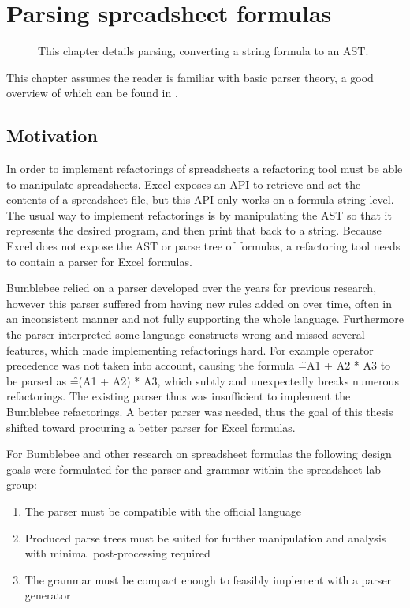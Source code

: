 \chapter{Parsing spreadsheet formulas}
\label{chapter:parsing}

\noindent
\begin{figure}[h]
\centerfloat

\caption{This chapter details parsing, converting a string formula to an AST.}
\end{figure}


\noindent
This chapter assumes the reader is familiar with basic parser theory, a good overview of which can be found in \cite{dragonbook}.

\section{Motivation}

In order to implement refactorings of spreadsheets a refactoring tool must be able to manipulate spreadsheets.
Excel exposes an API to retrieve and set the contents of a spreadsheet file, but this API only works on a formula string level.
The usual way to implement refactorings is by manipulating the AST so that it represents the desired program, and then print that back to a string.
Because Excel does not expose the AST or parse tree of formulas, a refactoring tool needs to contain a parser for Excel formulas.

Bumblebee relied on a parser developed over the years for previous research, however this parser suffered from having new rules added on over time, often in an inconsistent manner and not fully supporting the whole language.
Furthermore the parser interpreted some language constructs wrong and missed several features, which made implementing refactorings hard.
For example operator precedence was not taken into account, causing the formula \f{=A1 + A2 * A3} to be parsed as \f{=(A1 + A2) * A3}, which subtly and unexpectedly breaks numerous refactorings.
The existing parser thus was insufficient to implement the Bumblebee refactorings.
A better parser was needed, thus the goal of this thesis shifted toward procuring a better parser for Excel formulas.

For Bumblebee and other research on spreadsheet formulas the following design goals were formulated for the parser and grammar within the spreadsheet lab group:

\begin{enumerate}
\label{sec:designgoals}
\item The parser must be compatible with the official language
\item Produced parse trees must be suited for further manipulation and analysis with minimal post-processing required
\item The grammar must be compact enough to feasibly implement with a parser generator
\end{enumerate}

